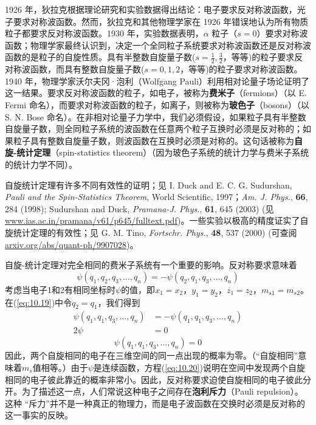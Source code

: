     1926 年，狄拉克根据理论研究和实验数据得出结论：电子要求反对称波函数，光子要求对称波函数。然而，狄拉克和其他物理学家在 1926 年错误地认为所有物质粒子都要求反对称波函数。1930 年，实验数据表明，$\alpha$ 粒子（$s=0$）要求对称波函数；物理学家最终认识到，决定一个全同粒子系统要求对称波函数还是反对称波函数的是粒子的自旋性质。具有半整数自旋量子数($s = \frac{1}{2}, \frac{3}{2}$，等等)的粒子要求反对称波函数，而具有整数自旋量子数($s = 0, 1, 2$，等等)的粒子要求对称波函数。1940 年，物理学家沃尔夫冈·泡利（Wolfgang Pauli）利用相对论量子场论证明了这一结果。要求反对称波函数的粒子，如电子，被称为\textbf{费米子}（fermions）（以 E. Fermi 命名），而要求对称波函数的粒子，如离子，则被称为\textbf{玻色子}（bosons）（以 S. N. Bose 命名）。在非相对论量子力学中，我们必须假设，如果粒子具有半整数自旋量子数，则全同粒子系统的波函数在任意两个粒子互换时必须是反对称的；如果粒子具有整数自旋量子数，则波函数在互换时必须是对称的。这句话被称为\textbf{自旋-统计定理}（spin-statistics theorem）（因为玻色子系统的统计力学与费米子系统的统计力学不同）。

    自旋统计定理有许多不同有效性的证明；见 I. Duck and E. C. G. Sudurshan, \textit{Pauli and the Spin-Statistics Theorem}, World Scientific, 1997；\textit{Am. J. Phys.}, \textbf{66}, 284 (1998); Sudurshan and Duck, \textit{Pramana-J. Phys.}, \textbf{61}, 645 (2003) (见 \url{www.ias.ac.in/pramana/v61/p645/fulltext.pdf})。一些实验以极高的精度证实了自旋统计定理的有效性；见 G. M. Tino, \textit{Fortschr. Phys.}, \textbf{48}, 537 (2000) (可查阅 \url{arxiv.org/abs/quant-ph/9907028})。

    自旋-统计定理对完全相同的费米子系统有一个重要的影响。反对称要求意味着
    \begin{equation}
        \psi\left(q_1, q_2, q_3, \ldots, q_n\right) = -\psi\left(q_2, q_1, q_3, \ldots, q_n\right)
        \label{eq:10.19}
    \end{equation}
    考虑当电子1和2有相同坐标时$\psi$的值，即$x_1 = x_2$，$y_1 = y_2$，$z_1 = z_2$，$m_{s1} = m_{s2}$。在(\ref{eq:10.19})中令$q_2 = q_1$，我们得到
    \begin{equation*}
        \begin{aligned}
            \psi\left(q_1, q_1, q_3, \ldots, q_n\right) &= -\psi\left(q_1, q_1, q_3, \ldots, q_n\right) \\
            2\psi &= 0
        \end{aligned}
    \end{equation*}
    \begin{equation}
        \psi\left(q_1, q_1, q_3, \ldots, q_n\right) = 0
        \label{eq:10.20}
    \end{equation}
    因此，两个自旋相同的电子在三维空间的同一点出现的概率为零。（“自旋相同”意味着$m_s$值相等。）由于$\psi$是连续函数，方程(\ref{eq:10.20})说明在空间中发现两个自旋相同的电子彼此靠近的概率非常小。因此，反对称要求迫使自旋相同的电子彼此分开。为了描述这一点，人们常说这种电子之间存在\textbf{泡利斥力}（Pauli repulsion）。这种 “斥力”并不是一种真正的物理力，而是电子波函数在交换时必须是反对称的这一事实的反映。

